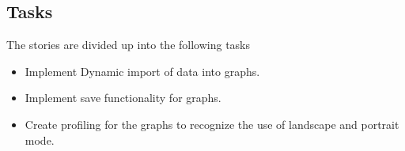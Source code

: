 \subsection{Tasks} %
\label{sub:Tasks}
The stories are divided up into the following tasks
\begin{itemize}
	\item Implement Dynamic import of data into graphs.
	\item Implement save functionality for graphs.
	\item Create profiling for the graphs to recognize the use of landscape and portrait mode.
\end{itemize}










